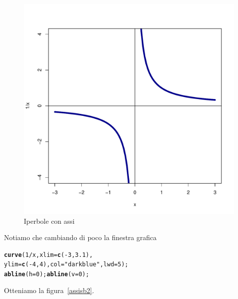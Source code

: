 \documentclass[onecolumn,11pt]{book}\usepackage[]{graphicx}\usepackage[]{color}
\makeatletter
\def\maxwidth{ %
  \ifdim\Gin@nat@width>\linewidth
    \linewidth
  \else
    \Gin@nat@width
  \fi
}
\newcommand{\hlnum}[1]{\textcolor[rgb]{0.686,0.059,0.569}{#1}}%
\newcommand{\hlstr}[1]{\textcolor[rgb]{0.192,0.494,0.8}{#1}}%
\newcommand{\hlopt}[1]{\textcolor[rgb]{0,0,0}{#1}}%
\newcommand{\hlstd}[1]{\textcolor[rgb]{0.345,0.345,0.345}{#1}}%
\newcommand{\hlkwc}[1]{\textcolor[rgb]{0.333,0.667,0.333}{#1}}%
\newcommand{\hlkwd}[1]{\textcolor[rgb]{0.737,0.353,0.396}{\textbf{#1}}}%
\newenvironment{kframe}{%
 \def\at@end@of@kframe{}%
 \ifinner\ifhmode%
  \def\at@end@of@kframe{\end{minipage}}%
  \begin{minipage}{\columnwidth}%
 \fi\fi%
 \def\FrameCommand##1{\hskip\@totalleftmargin \hskip-\fboxsep
 \colorbox{shadecolor}{##1}\hskip-\fboxsep
     \hskip-\linewidth \hskip-\@totalleftmargin \hskip\columnwidth}%
 \MakeFramed {\advance\hsize-\width
   \@totalleftmargin\z@ \linewidth\hsize
   \@setminipage}}%
 {\par\unskip\endMakeFramed%
 \at@end@of@kframe}
\newenvironment{knitrout}{}{} %
\makeatother
\begin{document}
\begin{itemize}
\begin{itemize}
\begin{figure}[ htbp]
\begin{center}
\begin{knitrout}
\color{fgcolor}
\includegraphics[width=\maxwidth]{figure/unnamed-chunk-87-1} 

\end{knitrout}
\caption{Iperbole con assi}
\label{assisb}
\end{center}
\end{figure}
Notiamo che cambiando di poco la finestra grafica

\begin{knitrout}
\color{fgcolor}\begin{kframe}
\begin{alltt}
 \hlkwd{curve}\hlstd{(}\hlnum{1}\hlopt{/}\hlstd{x,}\hlkwc{xlim}\hlstd{=}\hlkwd{c}\hlstd{(} \hlopt{-}\hlnum{3}\hlstd{,}\hlnum{3.1}\hlstd{),}
 \hlkwc{ylim}\hlstd{=}\hlkwd{c}\hlstd{(}\hlopt{-}\hlnum{4}\hlstd{,}\hlnum{4}\hlstd{),}\hlkwc{col}\hlstd{=}\hlstr{"darkblue"}\hlstd{,}\hlkwc{lwd}\hlstd{=}\hlnum{5}\hlstd{);}
 \hlkwd{abline}\hlstd{(}\hlkwc{h}\hlstd{=}\hlnum{0}\hlstd{);}\hlkwd{abline}\hlstd{(}\hlkwc{v}\hlstd{=}\hlnum{0}\hlstd{);}
\end{alltt}
\end{kframe}
\end{knitrout}
Otteniamo la figura~\ref{assisb2}.
\begin{figure}[ htbp]
\begin{center}


\end{center}
\end{figure}
\end{itemize}
\end{itemize}
\end{document}
